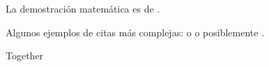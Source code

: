 \documentclass{article}
\begin{document}
La demostración matemática es de \citeyear{Graham1995}.

Algunos ejemplos de citas más complejas: \cite{Graham1995} o
\cite{Thomas2008} o posiblemente \cite{Graham1995}.

\cite[56]{Thomas2008}

\cite[Ver][45-48]{Graham1995}

Together \cite{Thomas2008,Graham1995}




\end{document}
